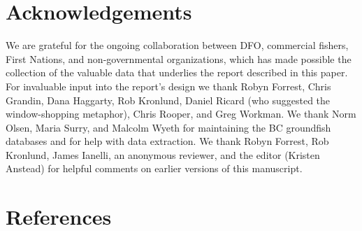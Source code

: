 \documentclass[12pt,]{article}
\begin{document}
\hypertarget{acknowledgements}{%
\section*{Acknowledgements}\label{acknowledgements}}

We are grateful for the ongoing collaboration between DFO, commercial fishers, First Nations, and non-governmental organizations, which has made possible the collection of the valuable data that underlies the report described in this paper. For invaluable input into the report's design we thank Robyn Forrest, Chris Grandin, Dana Haggarty, Rob Kronlund, Daniel Ricard (who suggested the window-shopping metaphor), Chris Rooper, and Greg Workman. We thank Norm Olsen, Maria Surry, and Malcolm Wyeth for maintaining the BC groundfish databases and for help with data extraction. We thank Robyn Forrest, Rob Kronlund, James Ianelli, an anonymous reviewer, and the editor (Kristen Anstead) for helpful comments on earlier versions of this manuscript.

\hypertarget{references}{%
\section*{References}\label{references}}
\end{document}
